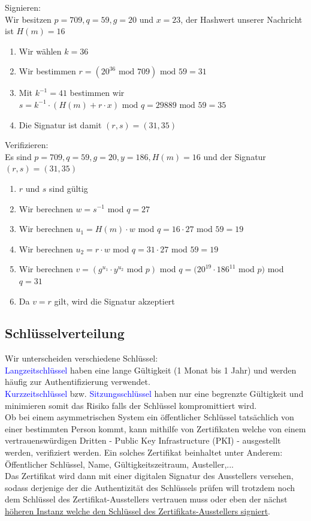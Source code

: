 \documentclass[a4paper,12pt,leqno]{article}
\newcommand{\blue}[1]{\textcolor{blue}{#1}}
\begin{document}
Signieren:\\
Wir besitzen $p=709,q=59,g=20$ und $x=23$, der Hashwert unserer Nachricht ist $H(m)=16$
\begin{enumerate}
\item Wir wählen $k=36$
\item Wir bestimmen $r=(20^{36}\textrm{ mod }709)\textrm{ mod }59=31$
\item Mit $k^{-1}=41$ bestimmen wir $s=k^{-1}\cdot (H(m)+r\cdot x)\textrm{ mod }q=29889\textrm{ mod }59=35$
\item Die Signatur ist damit $(r,s)=(31,35)$
\end{enumerate}

Verifizieren:\\
Es sind $p=709,q=59,g=20,y=186,H(m)=16$ und der Signatur $(r,s)=(31,35)$
\begin{enumerate}
\item $r$ und $s$ sind gültig
\item Wir berechnen $w=s^{-1}$ mod $q=27$
\item Wir berechnen $u_1=H(m)\cdot w$ mod $q=16\cdot 27$ mod $59=19$
\item Wir berechnen $u_2=r\cdot w$ mod $q=31\cdot 27$ mod $59=19$
\item Wir berechnen $v=(g^{u_1}\cdot y^{u_2}\textrm{ mod }p)$ mod $q=(20^{19}\cdot 186^{11}$ mod $p)$ mod $q =31$
\item Da $v=r$ gilt, wird die Signatur akzeptiert
\end{enumerate}

\subsection{Schlüsselverteilung}
\label{sec:Schlüsselverteilung}
Wir unterscheiden verschiedene Schlüssel:\\
\blue{Langzeitschlüssel} haben eine lange Gültigkeit (1 Monat bis 1 Jahr) und werden häufig zur Authentifizierung verwendet.\\
\blue{Kurzzeitschlüssel} bzw. \blue{Sitzungsschlüssel} haben nur eine begrenzte Gültigkeit und minimieren somit das Risiko falls der Schlüssel kompromittiert wird.\\

Ob bei einem asymmetrischen System ein öffentlicher Schlüssel tatsächlich von einer bestimmten Person kommt, kann mithilfe von Zertifikaten welche von einem vertrauenswürdigen Dritten - Public Key Infrastructure (PKI) - ausgestellt werden, verifiziert werden.
Ein solches Zertifikat beinhaltet unter Anderem: Öffentlicher Schlüssel, Name, Gültigkeitszeitraum, Austeller,...\\
Das Zertifikat wird dann mit einer digitalen Signatur des Ausstellers versehen, sodass derjenige der die Authentizität des Schlüssels prüfen will trotzdem noch dem Schlüssel des Zertifikat-Ausstellers vertrauen muss oder eben der nächst \hyperref[pic:Chainoftrust]{höheren Instanz welche den Schlüssel des Zertifikats-Ausstellers signiert}.
\end{document}
